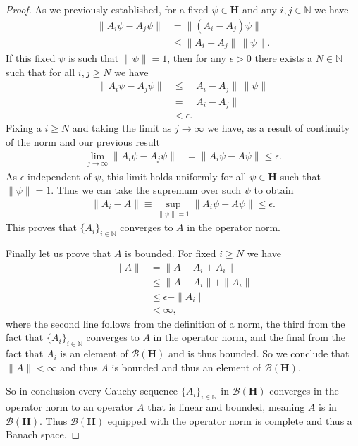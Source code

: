 \begin{proof}
    As we previously established, for a fixed $\psi \in \mathbf{H}$ and any $i,j \in \mathbb{N}$ we have
    \begin{align}
        \|A_i\psi - A_j\psi\| &= \|(A_i - A_j)\psi\| \\
                              &\le \|A_i - A_j\| \, \|\psi\|.
    \end{align}
    If this fixed $\psi$ is such that $\|\psi\| = 1$, then for any $\epsilon > 0$ there exists a $N \in \mathbb{N}$ such that for all $i,j \ge N$ we have
    \begin{align}
        \|A_i\psi - A_j\psi\| &\le \|A_i - A_j\| \, \|\psi\| \\
                              &= \|A_i - A_j\| \\
                              &< \epsilon.
    \end{align}
    Fixing a $i \ge N$ and taking the limit as $j \rightarrow \infty$ we have, as a result of continuity of the norm and our previous result
    \begin{align}
        \lim\limits_{j \rightarrow \infty} \|A_i\psi - A_j\psi\| &= \|A_i\psi - A\psi\| \le \epsilon.
    \end{align}
    As $\epsilon$ independent of $\psi$, this limit holds uniformly for all $\psi \in \mathbf{H}$ such that $\|\psi\| = 1$. Thus we can take the supremum over such $\psi$ to obtain
    \begin{align}
        \|A_i - A\| \equiv \sup\limits_{\|\psi\| = 1} \|A_i\psi - A\psi\| \le \epsilon.
    \end{align}
    This proves that $\{A_i\}_{i \in \mathbb{N}}$ converges to $A$ in the operator norm.

    Finally let us prove that $A$ is bounded. For fixed $i \ge N$ we have
    \begin{align}
        \|A\| &=   \|A - A_i + A_i\| \\
              &\le \|A - A_i\| + \|A_i\| \\
              &\le \epsilon + \|A_i\| \\
              &< \infty,
    \end{align}
    where the second line follows from the definition of a norm, the third from the fact that $\{A_i\}_{i \in \mathbb{N}}$ converges to $A$ in the operator norm, and the final from the fact that $A_i$ is an element of $\mathcal{B}(\mathbf{H})$ and is thus bounded. So we conclude that $\|A\| < \infty$ and thus $A$ is bounded and thus an element of $\mathcal{B}(\mathbf{H})$.

    So in conclusion every Cauchy sequence $\{A_i\}_{i \in \mathbb{N}}$ in $\mathcal{B}(\mathbf{H})$ converges in the operator norm to an operator $A$ that is linear and bounded, meaning $A$ is in $\mathcal{B}(\mathbf{H})$. Thus $\mathcal{B}(\mathbf{H})$ equipped with the operator norm is complete and thus a Banach space.
\end{proof}

